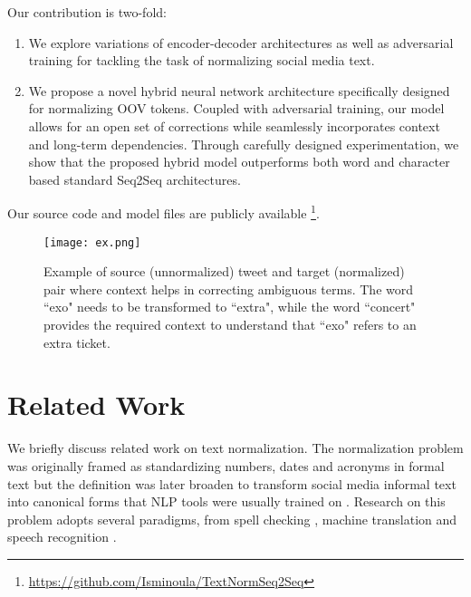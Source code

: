 \documentclass[letterpaper]{article} \usepackage{aaai19}  \usepackage{times}  \usepackage{helvet} \usepackage{courier}  \usepackage[hyphens]{url}  \usepackage{graphicx} \urlstyle{rm} \def\UrlFont{\rm}  \usepackage{graphicx}  \frenchspacing  \setlength{\pdfpagewidth}{8.5in}  \setlength{\pdfpageheight}{11in}
\newcommand{\citep}{\cite}
\begin{document}
Our contribution is two-fold: 
\begin{enumerate}
    \item We explore variations of encoder-decoder architectures as well as adversarial training for tackling the task of normalizing social media text.
    \item We propose a novel hybrid  neural network architecture specifically designed for normalizing OOV tokens. Coupled with adversarial training, our model allows for an open set of corrections while seamlessly incorporates context and long-term dependencies. 
    Through carefully designed experimentation, we show that the proposed hybrid model outperforms both word and character based standard Seq2Seq architectures.
\end{enumerate}

Our source code and model files are publicly available \footnote{\url{https://github.com/Isminoula/TextNormSeq2Seq}}.


\begin{figure}
    \centering
    \texttt{[image: ex.png]}
    \caption{Example of source (unnormalized) tweet and target (normalized) pair where context helps in correcting ambiguous terms. The word ``exo" needs to be transformed to ``extra", while the word ``concert" provides the required context to understand that ``exo" refers to an extra ticket.}
    \label{fig:example}
\end{figure}

\section{Related Work}\label{sec:soa}
We briefly discuss related work on text normalization. The normalization problem was originally framed as standardizing numbers, dates and acronyms in formal text \citep{sproat2001normalization} but the definition was later broaden to transform social media informal text into canonical forms that NLP tools were usually trained on \citep{sproat2001normalization}. Research on this problem adopts several paradigms, from spell checking \citep{choudhury2007investigation}, machine translation 
\citep{aw2006phrase,ling2013paraphrasing} and speech recognition \citep{kobus2008normalizing}.
\end{document}
